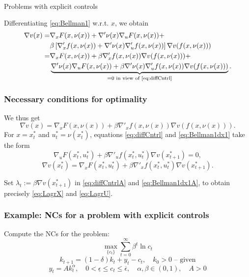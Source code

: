 \documentclass[10pt]{beamer}
\theoremstyle{definition}
\begin{document}
\begin{section}{Problems with explicit controls}
\begin{frame}[fragile]
Differentiating \eqref{eq:Bellman1} w.r.t. $ x $, we obtain
\begin{equation*}
\begin{split}
 \nabla v(x) = & \nabla_x F(x,\nu(x)) +  \nabla' \nu(x)  \nabla_u F(x,\nu(x)) + \\
 & \beta \left[ \nabla'_x f(x,\nu(x)) + \nabla' \nu(x)  \nabla'_u f(x,\nu(x))  \right] \nabla v(f(x,\nu(x)))\\
 = & \nabla_x F(x,\nu(x)) + \beta  \nabla'_x f(x,\nu(x)) \nabla v(f(x,\nu(x))) + \\
 &  \underbrace{\nabla' \nu(x)  \nabla_u F(x,\nu(x)) + \beta \nabla' \nu(x)  \nabla'_u f(x,\nu(x)) \nabla v(f(x,\nu(x)))}_{=0 \text{ in view of \eqref{eq:diffCntrl}}}.
\end{split}
\end{equation*}
\end{frame}


\begin{frame}[fragile]
\frametitle{Necessary conditions for optimality}
We thus get \begin{equation}
\nabla v(x) = \nabla_x F(x,\nu(x)) + \beta  \nabla'_x f(x,\nu(x)) \nabla v(f(x,\nu(x))).
\label{eq:Bellman1dx1}
\end{equation}
For $ x=x^*_t $ and $ u^*_t = \nu(x^*_t) $, equations \eqref{eq:diffCntrl} and \eqref{eq:Bellman1dx1} take the form
\begin{equation}
\nabla_u F(x^*_t,u^*_t) + \beta \nabla'_u f(x^*_t,u^*_t)  \nabla v(x^*_{t+1}) = 0,
\label{eq:diffCntrlA} 
\end{equation}
\begin{equation}
\nabla v(x^*_t) = \nabla_x F(x^*_t,u^*_t) + \beta  \nabla'_x f(x^*_t,u^*_t) \nabla v(x^*_{t+1}).
\label{eq:Bellman1dx1A}
\end{equation}

Set $ \lambda_t := \beta \nabla v(x^*_{t+1}) $ in \eqref{eq:diffCntrlA} and \eqref{eq:Bellman1dx1A}, to obtain precisely \eqref{eq:LagrX} and \eqref{eq:LagrU}.
\end{frame}


\begin{frame}[fragile]
\frametitle{Example: NCs for a problem with explicit controls}
Compute the NCs for the problem:
\[ \max_{\{c_t\}} \sum_{t=0}^{\infty}\beta^t \ln c_t  \]
\[ k_{t+1} = (1-\delta)k_t + y_t - c_t,\quad k_0>0 \text{ -- given} \] \[ y_t=A k_t^\alpha , \quad 0<\underline{\epsilon} \leq c_t \leq \overline{\epsilon}, \quad \alpha,\beta \in (0,1), \quad A>0\]\bigskip \pause


\end{frame}
\end{section}
\end{document}
